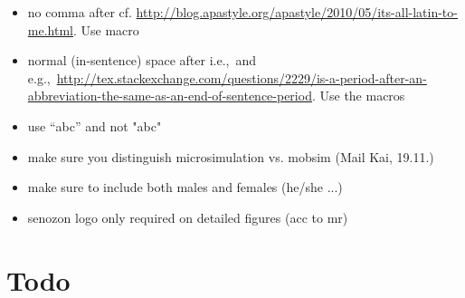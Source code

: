\begin{itemize}
\item no comma after cf. \url{http://blog.apastyle.org/apastyle/2010/05/its-all-latin-to-me.html}. Use macro \cf

\item normal (in-sentence) space after i.e.,\ and e.g.,\ \url{http://tex.stackexchange.com/questions/2229/is-a-period-after-an-abbreviation-the-same-as-an-end-of-sentence-period}. Use the macros \eg \ie 

\item use ``abc'' and not "abc"

\item make sure you distinguish  \gls{microsimulation} vs. \gls{mobsim} (Mail Kai, 19.11.)

\item make sure to include both males and females (he/she ...)

\item \gls{senozon} logo only required on detailed figures (acc to mr)

\end{itemize}

\vfill\eject

\section*{Todo}

